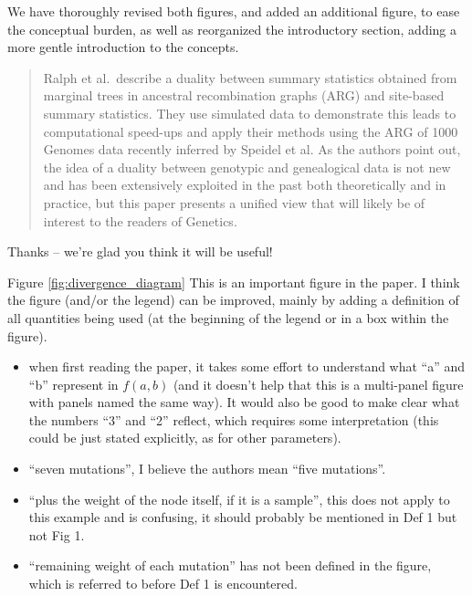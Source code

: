 We have thoroughly revised both figures, and added an additional figure,
to ease the conceptual burden,
as well as reorganized the introductory section,
adding a more gentle introduction to the concepts.




\begin{quote}
Ralph et al.\ describe a duality between summary statistics obtained from marginal trees in ancestral recombination graphs (ARG) and site-based summary statistics.
They use simulated data to demonstrate this leads to computational speed-ups and apply their methods using the ARG of 1000 Genomes data recently inferred by Speidel et al.
As the authors point out, the idea of a duality between genotypic and genealogical data is not new and has been extensively exploited in the past both theoretically and in practice,
but this paper presents a unified view that will likely be of interest to the readers of Genetics.
\end{quote}

Thanks -- we're glad you think it will be useful!

\begin{point}{Figure \ref{fig:divergence_diagram}}
    This is an important figure in the paper. I think the figure (and/or the legend) can be improved, mainly by adding a definition of all quantities being used (at the beginning of the legend or in a box within the figure).
    \begin{itemize}
        \item when first reading the paper, it takes some effort to understand what ``a'' and ``b'' represent in $f(a,b)$
            (and it doesn't help that this is a multi-panel figure with panels named the same way).
            It would also be good to make clear what the numbers ``3'' and ``2'' reflect, which requires some interpretation (this could be just stated explicitly, as for other parameters).
        \item ``seven mutations'', I believe the authors mean ``five mutations''.
        \item ``plus the weight of the node itself, if it is a sample'', this does not apply to this example and is confusing, it should probably be mentioned in Def 1 but not Fig 1.
        \item ``remaining weight of each mutation'' has not been defined in the figure, which is referred to before Def 1 is encountered.
    \end{itemize}
\end{point}


